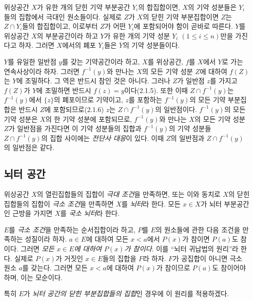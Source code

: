\begin{env}[2.1.7]
\label{0.2.1.7-ko}
위상공간 $X$가 유한 개의 닫힌 기약 부분공간 $Y_i$의 합집합이면, $X$의 기약 성분들은 $Y_i$들의 집합에서 극대인 원소들이다. 실제로 $Z$가 $X$의 닫힌 기약 부분집합이면 $Z$는 $Z\cap Y_i$들의 합집합이고, 이로부터 $Z$가 어떤 $Y_i$에 포함되어야 함이 곧바로 따른다. $Y$를 위상공간 $X$의 부분공간이라 하고 $Y$가 유한 개의 기약 성분 $Y_i$ $(1\leq i\leq n)$만을 가진다고 하자. 그러면 $X$에서의 폐포 $\overline{Y_i}$들은 $\overline Y$의 기약 성분들이다.
\end{env}

\begin{env}[2.1.8]
\label{0.2.1.8-ko}
$Y$를 유일한 일반점 $y$를 갖는 기약공간이라 하고, $X$를 위상공간, $f$를 $X$에서 $Y$로 가는 연속사상이라 하자. 그러면 $f^{-1}(y)$와 만나는 $X$의 모든 기약 성분 $Z$에 대하여 $f(Z)$는 $Y$에 조밀하다. 그 역은 반드시 참인 것은 아니다. 그러나 $Z$가 일반점 $z$를 가지고 $f(Z)$가 $Y$에 조밀하면 반드시 $f(z)=y$이다(2.1.5). 또한 이때 $Z\cap f^{-1}(y)$는 $f^{-1}(y)$에서 $\{z\}$의 폐포이므로 기약이고, $z$를 포함하는 $f^{-1}(y)$의 모든 기약 부분집합은 반드시 $Z$에 포함되므로(2.1.6) $z$는 $Z\cap f^{-1}(y)$의 일반점이다. $f^{-1}(y)$의 모든 기약 성분은 $X$의 한 기약 성분에 포함되므로, $f^{-1}(y)$와 만나는 $X$의 모든 기약 성분 $Z$가 일반점을 가진다면 이 기약 성분들의 집합과 $f^{-1}(y)$의 기약 성분들 $Z\cap f^{-1}(y)$의 집합 사이에는 \emph{전단사 대응}이 있다. 이때 $Z$의 일반점과 $Z\cap f^{-1}(y)$의 일반점은 같다.
\end{env}


\subsection{뇌터 공간}
\label{subsection:0.2.2-ko}

\begin{env}[2.2.1]
\label{0.2.2.1-ko}
위상공간 $X$의 열린집합들의 집합이 \emph{극대 조건}을 만족하면, 또는 이와 동치로 $X$의 닫힌집합들의 집합이 \emph{극소 조건}을 만족하면 $X$를 \emph{뇌터}라 한다. 모든 $x\in X$가 뇌터 부분공간인 근방을 가지면 $X$를 \emph{국소 뇌터}라 한다.
\end{env}

\begin{env}[2.2.2]
\label{0.2.2.2-ko}
$E$를 \emph{극소 조건}을 만족하는 순서집합이라 하고, $P$를 $E$의 원소들에 관한 다음 조건을 만족하는 성질이라 하자. $a\in E$에 대하여 모든 $x<a$에서 $P(x)$가 참이면 $P(a)$도 참이다. 그러면 \emph{모든 $x\in E$에 대하여 $P(x)$가 참이다}. 이를 ``뇌터 귀납법의 원리''라 한다. 실제로 $P(x)$가 거짓인 $x\in E$들의 집합을 $F$라 하자. $F$가 공집합이 아니면 극소 원소 $a$를 갖는다. 그러면 모든 $x<a$에 대하여 $P(x)$가 참이므로 $P(a)$도 참이어야 하며, 이는 모순이다.

특히 $E$가 \emph{뇌터 공간의 닫힌 부분집합들의 집합}인 경우에 이 원리를 적용하겠다.
\end{env}

